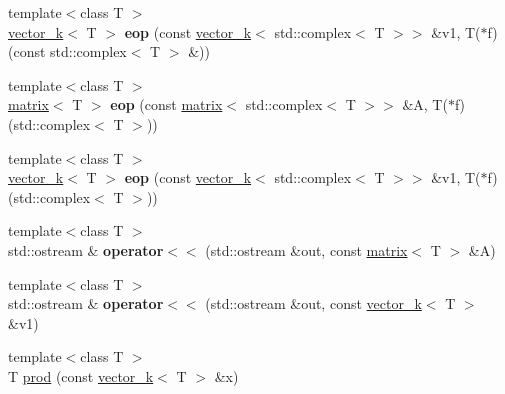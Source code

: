 \begin{DoxyCompactItemize}
\item 
\hypertarget{namespacekeycpp_afc7610588aa92335352b2796ebdd359d}{{\footnotesize template$<$class T $>$ }\\\hyperlink{classkeycpp_1_1vector__k}{vector\-\_\-k}$<$ T $>$ {\bfseries eop} (const \hyperlink{classkeycpp_1_1vector__k}{vector\-\_\-k}$<$ std\-::complex$<$ T $>$$>$ \&v1, T($\ast$f)(const std\-::complex$<$ T $>$ \&))}\label{namespacekeycpp_afc7610588aa92335352b2796ebdd359d}

\item 
\hypertarget{namespacekeycpp_ae14b016d01024e738c3110299ee58666}{{\footnotesize template$<$class T $>$ }\\\hyperlink{classkeycpp_1_1matrix}{matrix}$<$ T $>$ {\bfseries eop} (const \hyperlink{classkeycpp_1_1matrix}{matrix}$<$ std\-::complex$<$ T $>$$>$ \&A, T($\ast$f)(std\-::complex$<$ T $>$))}\label{namespacekeycpp_ae14b016d01024e738c3110299ee58666}

\item 
\hypertarget{namespacekeycpp_a31115adc10089fbbc732d59362890af2}{{\footnotesize template$<$class T $>$ }\\\hyperlink{classkeycpp_1_1vector__k}{vector\-\_\-k}$<$ T $>$ {\bfseries eop} (const \hyperlink{classkeycpp_1_1vector__k}{vector\-\_\-k}$<$ std\-::complex$<$ T $>$$>$ \&v1, T($\ast$f)(std\-::complex$<$ T $>$))}\label{namespacekeycpp_a31115adc10089fbbc732d59362890af2}

\item 
\hypertarget{namespacekeycpp_a55e8bada51586c0561e1b32ca1ab5f2a}{{\footnotesize template$<$class T $>$ }\\std\-::ostream \& {\bfseries operator$<$$<$} (std\-::ostream \&out, const \hyperlink{classkeycpp_1_1matrix}{matrix}$<$ T $>$ \&A)}\label{namespacekeycpp_a55e8bada51586c0561e1b32ca1ab5f2a}

\item 
\hypertarget{namespacekeycpp_a86f8946c126102b4467b70da16766b7a}{{\footnotesize template$<$class T $>$ }\\std\-::ostream \& {\bfseries operator$<$$<$} (std\-::ostream \&out, const \hyperlink{classkeycpp_1_1vector__k}{vector\-\_\-k}$<$ T $>$ \&v1)}\label{namespacekeycpp_a86f8946c126102b4467b70da16766b7a}

\item 
\hypertarget{namespacekeycpp_add55ad2a40111d6368744a3d4144f25a}{{\footnotesize template$<$class T $>$ }\\T \hyperlink{namespacekeycpp_add55ad2a40111d6368744a3d4144f25a}{prod} (const \hyperlink{classkeycpp_1_1vector__k}{vector\-\_\-k}$<$ T $>$ \&x)}\label{namespacekeycpp_add55ad2a40111d6368744a3d4144f25a}


\end{DoxyCompactItemize}
